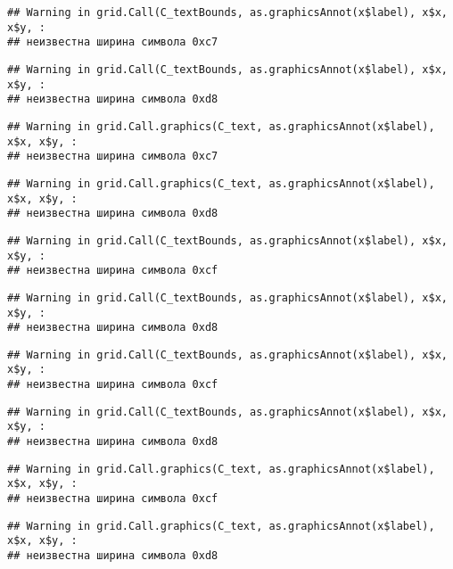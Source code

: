 \documentclass[
]{article}
\begin{document}
\begin{verbatim}
## Warning in grid.Call(C_textBounds, as.graphicsAnnot(x$label), x$x, x$y, :
## неизвестна ширина символа 0xc7
\end{verbatim}

\begin{verbatim}
## Warning in grid.Call(C_textBounds, as.graphicsAnnot(x$label), x$x, x$y, :
## неизвестна ширина символа 0xd8
\end{verbatim}

\begin{verbatim}
## Warning in grid.Call.graphics(C_text, as.graphicsAnnot(x$label), x$x, x$y, :
## неизвестна ширина символа 0xc7
\end{verbatim}

\begin{verbatim}
## Warning in grid.Call.graphics(C_text, as.graphicsAnnot(x$label), x$x, x$y, :
## неизвестна ширина символа 0xd8
\end{verbatim}

\begin{verbatim}
## Warning in grid.Call(C_textBounds, as.graphicsAnnot(x$label), x$x, x$y, :
## неизвестна ширина символа 0xcf
\end{verbatim}

\begin{verbatim}
## Warning in grid.Call(C_textBounds, as.graphicsAnnot(x$label), x$x, x$y, :
## неизвестна ширина символа 0xd8
\end{verbatim}

\begin{verbatim}
## Warning in grid.Call(C_textBounds, as.graphicsAnnot(x$label), x$x, x$y, :
## неизвестна ширина символа 0xcf
\end{verbatim}

\begin{verbatim}
## Warning in grid.Call(C_textBounds, as.graphicsAnnot(x$label), x$x, x$y, :
## неизвестна ширина символа 0xd8
\end{verbatim}

\begin{verbatim}
## Warning in grid.Call.graphics(C_text, as.graphicsAnnot(x$label), x$x, x$y, :
## неизвестна ширина символа 0xcf
\end{verbatim}

\begin{verbatim}
## Warning in grid.Call.graphics(C_text, as.graphicsAnnot(x$label), x$x, x$y, :
## неизвестна ширина символа 0xd8
\end{verbatim}
\end{document}
